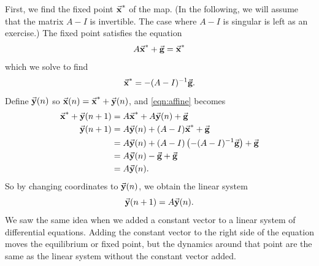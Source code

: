 First, we find the fixed point $\vec{\textbf{x}}^*$ of the map.
(In the following, we will assume that 
the matrix $A-I$ is invertible.  The case
where $A-I$ is singular is left as an exercise.)
The fixed point satisfies the equation
\begin{equation}
   A\vec{\textbf{x}}^* + \vec{\textbf{g}}  = \vec{\textbf{x}}^*
\end{equation}
which we solve to find
\begin{equation}
   \vec{\textbf{x}}^*  = -(A-I)^{-1}\vec{\textbf{g}}.
\end{equation}
Define $\vec{\textbf{y}}(n)$ so $\vec{\textbf{x}}(n) = \vec{\textbf{x}}^* + \vec{\textbf{y}}(n)$,
and \eqref{eqn:affine} becomes
\begin{equation}
\begin{split}
  \vec{\textbf{x}}^* + \vec{\textbf{y}}(n+1) & = A\vec{\textbf{x}}^* + A\vec{\textbf{y}}(n) +\vec{\textbf{g}} \\
  \vec{\textbf{y}}(n+1) & = A\vec{\textbf{y}}(n) + (A-I)\vec{\textbf{x}}^* + \vec{\textbf{g}} \\
            & = A\vec{\textbf{y}}(n) + (A-I)\left(-(A-I)^{-1}\vec{\textbf{g}}\right)+\vec{\textbf{g}} \\
	    & = A\vec{\textbf{y}}(n) -\vec{\textbf{g}}+\vec{\textbf{g}} \\
	    & = A\vec{\textbf{y}}(n).
\end{split}
\end{equation}
So by changing coordinates to $\vec{\textbf{y}}(n)$, we obtain
the linear system
\begin{equation}
  \vec{\textbf{y}}(n+1) = A\vec{\textbf{y}}(n) .
\end{equation}
We saw the same idea when we added a constant vector to a
linear system of differential equations.
Adding the constant vector to the right side of the equation
moves the equilibrium or fixed point, but
the dynamics around that point are the same
as the linear system without the constant vector added.

\newpage

